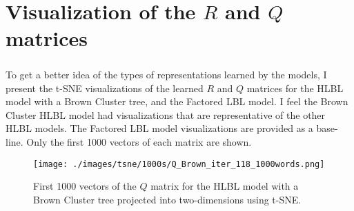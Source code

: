 
\chapter{Visualization of the $R$ and $Q$ matrices}
\paragraph{}
To get a better idea of the types of representations learned by the models, I present the t-SNE visualizations of the learned $R$ and $Q$ matrices for the HLBL model with a Brown Cluster tree, and the Factored LBL model. I feel the Brown Cluster HLBL model had visualizations that are representative of the other HLBL models. The Factored LBL model visualizations are provided as a base-line. Only the first 1000 vectors of each matrix are shown.



\begin{figure}[ht]
\texttt{[image: ./images/tsne/1000s/Q\_Brown\_iter\_118\_1000words.png]} 
\centering
\caption{First 1000 vectors of the $Q$ matrix for the HLBL model with a Brown Cluster tree projected into two-dimensions using t-SNE.}
\end{figure}
%
%
%
%

